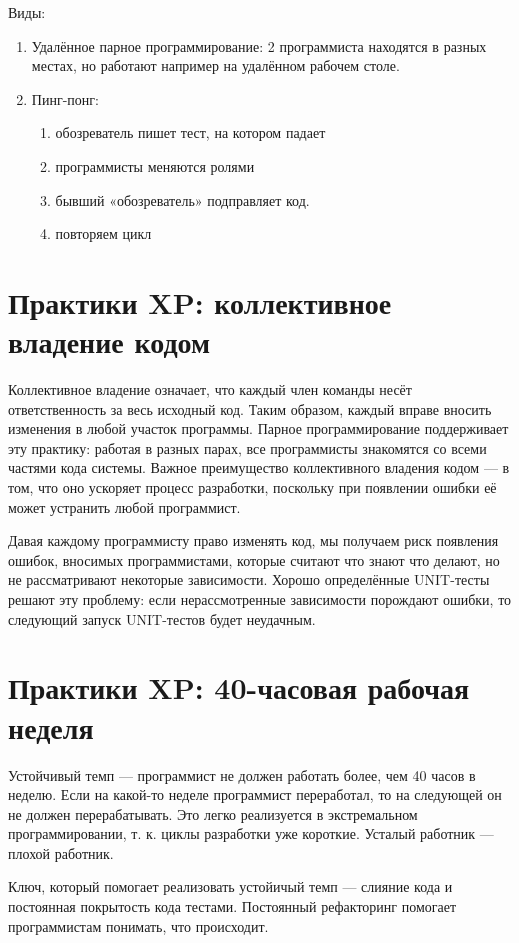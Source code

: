 \documentclass{article}
\let\stdsection\section
\renewcommand\section{\newpage\stdsection}
\begin{document}
    Виды:
    \begin{enumerate}
        \item Удалённое парное программирование: 2 программиста находятся в разных местах, но работают например на удалённом рабочем столе.
        \item Пинг-понг:
        \begin{enumerate}
            \item обозреватель пишет тест, на котором падает
            \item программисты меняются ролями
            \item бывший «обозреватель» подправляет код.
            \item повторяем цикл
        \end{enumerate}
    \end{enumerate}

\section{Практики XP: коллективное владение кодом}
    Коллективное владение означает, что каждый член команды несёт ответственность за весь исходный код. Таким образом, каждый вправе вносить изменения в любой участок программы. Парное программирование поддерживает эту практику: работая в разных парах, все программисты знакомятся со всеми частями кода системы. Важное преимущество коллективного владения кодом — в том, что оно ускоряет процесс разработки, поскольку при появлении ошибки её может устранить любой программист.

    Давая каждому программисту право изменять код, мы получаем риск появления ошибок, вносимых программистами, которые считают что знают что делают, но не рассматривают некоторые зависимости. Хорошо определённые UNIT-тесты решают эту проблему: если нерассмотренные зависимости порождают ошибки, то следующий запуск UNIT-тестов будет неудачным.

\section{Практики XP: 40-часовая рабочая неделя}
    Устойчивый темп — программист не должен работать более, чем 40 часов в неделю. Если на какой-то неделе программист переработал, то на следующей он не должен перерабатывать. Это легко реализуется в экстремальном программировании, т. к. циклы разработки уже короткие. Усталый работник — плохой работник.

    Ключ, который помогает реализовать устойичый темп — слияние кода и постоянная покрытость кода тестами. Постоянный рефакторинг помогает программистам понимать, что происходит.
\end{document}
